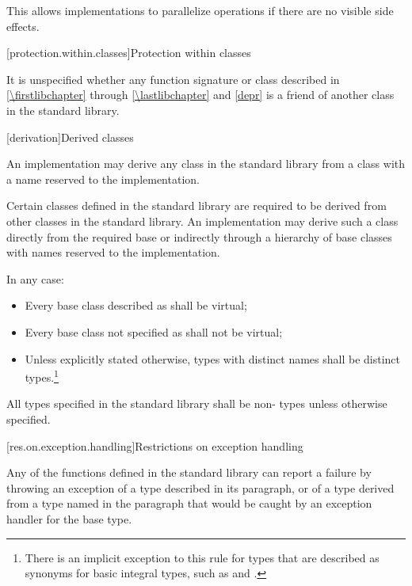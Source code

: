\pnum
\begin{note} This allows implementations to parallelize operations if there are no visible
%
side effects. \end{note}

[protection.within.classes]{Protection within classes}

\pnum
{}%
It is unspecified whether any function signature or class described in
\ref{\firstlibchapter} through \ref{\lastlibchapter} and \ref{depr} is a
friend of another class in the \Cpp{} standard library.

[derivation]{Derived classes}

\pnum
{}%
%
An implementation may derive any class in the \Cpp{} standard library from a class with a
name reserved to the implementation.

\pnum
Certain classes defined in the \Cpp{} standard library are required to be derived from
other classes
in the \Cpp{} standard library.
%
An implementation may derive such a class directly from the required base or indirectly
through a hierarchy of base classes with names reserved to the implementation.

\pnum
In any case:

\begin{itemize}
\item
Every base class described as
shall be virtual;
%
\item
Every base class not specified as
 shall not be virtual;
\item
Unless explicitly stated otherwise, types with distinct names shall be distinct
types.\footnote{There is an implicit exception to this rule for types that are
described as synonyms for basic integral types, such as
 and
.}
\end{itemize}

\pnum
All types specified in the \Cpp{} standard library shall be non- types
unless otherwise specified.

[res.on.exception.handling]{Restrictions on exception handling}%
%

\pnum
Any of the functions defined in the \Cpp{} standard library
%
can report a failure by throwing an exception of a type described in its
\throws
paragraph,
or of a type derived from a type named in the
\throws
paragraph
that would be caught by
an exception handler
for the base type.

